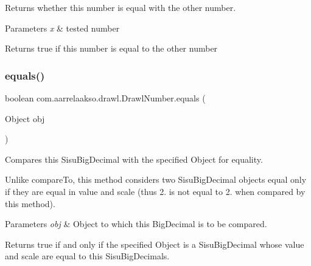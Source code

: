 Returns whether this number is equal with the other number. 


\begin{DoxyParams}{Parameters}
{\em x} & tested number \\
\hline
\end{DoxyParams}
\begin{DoxyReturn}{Returns}
true if this number is equal to the other number 
\end{DoxyReturn}
\mbox{\label{classcom_1_1aarrelaakso_1_1drawl_1_1_drawl_number_a1599c6bdf131bc6b8a985f6a4b1b6f00}} 
\subsubsection{\texorpdfstring{equals()}{equals()}\hspace{0.1cm}{\footnotesize\ttfamily [3/3]}}
{\footnotesize\ttfamily boolean com.\+aarrelaakso.\+drawl.\+Drawl\+Number.\+equals (\begin{DoxyParamCaption}\item[{Object}]{obj }\end{DoxyParamCaption})}



Compares this Sisu\+Big\+Decimal with the specified Object for equality. 

Unlike compare\+To, this method considers two Sisu\+Big\+Decimal objects equal only if they are equal in value and scale (thus 2. is not equal to 2. when compared by this method).


\begin{DoxyParams}{Parameters}
{\em obj} & Object to which this Big\+Decimal is to be compared. \\
\hline
\end{DoxyParams}
\begin{DoxyReturn}{Returns}
true if and only if the specified Object is a Sisu\+Big\+Decimal whose value and scale are equal to this Sisu\+Big\+Decimal\textquotesingle{}s. 
\end{DoxyReturn}
\mbox{\label{classcom_1_1aarrelaakso_1_1drawl_1_1_drawl_number_ae8442cbd5cc7ab0c35c0302b196b3819}} 
